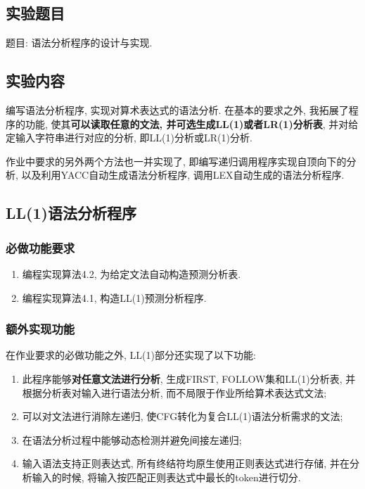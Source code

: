 \subsection{实验题目}
题目: 语法分析程序的设计与实现.

\subsection{实验内容}
编写语法分析程序, 实现对算术表达式的语法分析. 在基本的要求之外,
我拓展了程序的功能, 使其\textbf{可以读取任意的文法,
	并可选生成LL(1)或者LR(1)分析表}, 并对给定输入字符串进行对应的分析,
即LL(1)分析或LR(1)分析.\par

作业中要求的另外两个方法也一并实现了, 即编写递归调用程序实现自顶向下的分析,
以及利用YACC自动生成语法分析程序, 调用LEX自动生成的语法分析程序.

\subsection{LL(1)语法分析程序}
\subsubsection{必做功能要求}
\begin{enumerate}
	\item 编程实现算法4.2, 为给定文法自动构造预测分析表.
	\item 编程实现算法4.1, 构造LL(1)预测分析程序.
\end{enumerate}

\subsubsection{额外实现功能}
在作业要求的必做功能之外, LL(1)部分还实现了以下功能:
\begin{enumerate}
	\item 此程序能够\textbf{对任意文法进行分析}, 生成FIRST, FOLLOW集和LL(1)分析表,
	      并根据分析表对输入进行语法分析, 而不局限于作业所给算术表达式文法;
	\item 可以对文法进行消除左递归, 使CFG转化为复合LL(1)语法分析需求的文法;
	\item 在语法分析过程中能够动态检测并避免间接左递归;
	\item 输入语法支持正则表达式, 所有终结符均原生使用正则表达式进行存储,
	      并在分析输入的时候, 将输入按匹配正则表达式中最长的token进行切分.
\end{enumerate}

